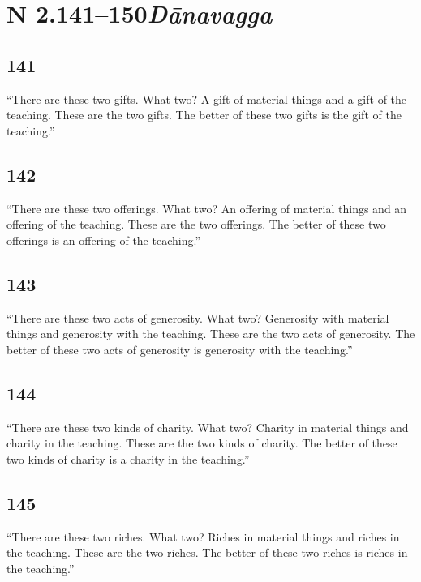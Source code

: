 \documentclass[12pt,openany]{book}%
\newcommand*{\suttatitleacronym}[1]{\smaller[2]{#1}\vspace*{.3em}}
\newcommand*{\suttatitleroot}[1]{\linebreak\smaller[2]\itshape{#1}}
\newcommand*{\tocacronym}[1]{\hspace*{-3.3em}{#1}\quad}
\newcommand*{\tocroot}[1]{(\textit{#1})}
\begin{document}
%
\section*{{\suttatitleacronym AN 2.141–150}{\suttatitleroot Dānavagga}}
\addcontentsline{toc}{section}{\tocacronym{AN 2.141–150} \tocroot{Dānavagga}}

\subsection*{141 }

“There are these two gifts. What two? A gift of material things and a gift of the teaching. These are the two gifts. The better of these two gifts is the gift of the teaching.” 

\subsection*{142 }

“There are these two offerings. What two? An offering of material things and an offering of the teaching. These are the two offerings. The better of these two offerings is an offering of the teaching.” 

\subsection*{143 }

“There are these two acts of generosity. What two? Generosity with material things and generosity with the teaching. These are the two acts of generosity. The better of these two acts of generosity is generosity with the teaching.” 

\subsection*{144 }

“There are these two kinds of charity. What two? Charity in material things and charity in the teaching. These are the two kinds of charity. The better of these two kinds of charity is a charity in the teaching.” 

\subsection*{145 }

“There are these two riches. What two? Riches in material things and riches in the teaching. These are the two riches. The better of these two riches is riches in the teaching.” 
\end{document}
